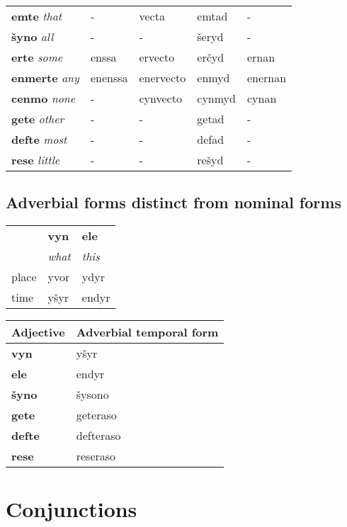 \documentclass{book}
\begin{document}
\begin{center}
\begin{tabular}{|l|l|l|l|l|}
  	\textbf{emte} \emph{that} & - & vecta & emtad & - \\
  	\textbf{šyno} \emph{all} & - & - & šeryd & - \\
  	\textbf{erte} \emph{some} & enssa & ervecto & erčyd & ernan \\
  	\textbf{enmerte} \emph{any} & enenssa & enervecto & enmyd & enernan \\
  	\textbf{cenmo} \emph{none} & - & cynvecto & cynmyd & cynan \\
  	\textbf{gete} \emph{other} & - & - & getad & - \\
  	\textbf{defte} \emph{most} & - & - & defad & - \\
  	\textbf{rese} \emph{little} & - & - & rešyd & - \\ \hline
  \end{tabular}
\end{center}

\subsection{Adverbial forms distinct from nominal forms}

\begin{center}
\begin{tabular}{|l|l|l|}
  \hline
  & \textbf{vyn} & \textbf{ele} \\
  & \emph{what} & \emph{this} \\ \hline
  place & yvor & ydyr \\
  time & yšyr & endyr \\ \hline
\end{tabular}

\begin{tabular}{|l|l|}
  \hline
  Adjective & Adverbial temporal form \\ \hline
  \textbf{vyn} & yšyr \\
  \textbf{ele} & endyr \\
  \textbf{šyno} & šysono \\
  \textbf{gete} & geteraso \\
  \textbf{defte} & defteraso \\
  \textbf{rese} & reseraso \\ \hline
\end{tabular}
\end{center}

\section{Conjunctions}
\end{document}
